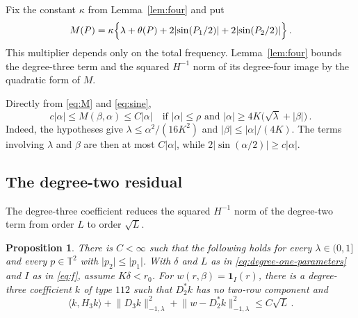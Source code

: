 \documentclass[11pt]{amsart}
\theoremstyle{plain}
\newtheorem{proposition}[theorem]{Proposition}
\theoremstyle{definition}
\newcommand{\T}{\mathbb T}
\newcommand{\1}{\mathbf 1}
\newcommand{\ip}[2]{\langle #1,#2\rangle}
\newcommand{\norm}[1]{\lVert #1\rVert}
\newcommand{\abs}[1]{\lvert #1\rvert}
\newcommand{\Hminus}[1]{\norm{#1}_{-1,\lambda}}
\begin{document}
Fix the constant $\kappa$ from Lemma~\ref{lem:four} and put
\begin{equation}\label{eq:M}
  M(P)=\kappa\Bigl\{\lambda+\theta(P)+2\abs{\sin(P_1/2)}
    +2\abs{\sin(P_2/2)}\Bigr\}\, .
\end{equation}
This multiplier depends only on the total frequency.  Lemma~\ref{lem:four}
bounds the degree-three term and the squared $H^{-1}$ norm of its
degree-four image by the quadratic form of $M$.

Directly from \eqref{eq:M} and \eqref{eq:sine},
\begin{equation}\label{eq:Mcomp}
  c\abs\alpha\leq M(\beta,\alpha)\leq C\abs\alpha
  \quad\text{if }\abs\alpha\leq\rho\text{ and }
  \abs\alpha\geq4K\bigl(\sqrt\lambda+\abs\beta\bigr)\, .
\end{equation}
Indeed, the hypotheses give $\lambda\leq\alpha^2/(16K^2)$ and
$\abs\beta\leq\abs\alpha/(4K)$.  The terms involving $\lambda$ and $\beta$
are then at most $C\abs\alpha$, while
$2\abs{\sin(\alpha/2)}\geq c\abs\alpha$.

\subsection{The degree-two residual}\label{ssec:degree-two}

The degree-three coefficient reduces the squared $H^{-1}$ norm of the
degree-two term from order $L$ to order $\sqrt L$.

\begin{proposition}\label{prop:key}
There is $C<\infty$ such that the following holds for every
$\lambda\in(0,1]$ and every $p\in\T^2$ with $\abs{p_2}\leq\abs{p_1}$.  With
$\delta$ and $L$ as in \eqref{eq:degree-one-parameters} and $I$ as in
\eqref{eq:f}, assume $K\delta<r_0$.  For
$w(r,\beta)=\1_I(r)$, there is a degree-three coefficient $k$ of type $112$
such that $D_2^*k$ has no two-row component and
\begin{equation}\label{eq:key}
  \ip k{H_3k}+\Hminus{D_3k}^2+\Hminus{w-D_2^*k}^2
  \leq C\sqrt L\, .
\end{equation}
\end{proposition}
\end{document}
